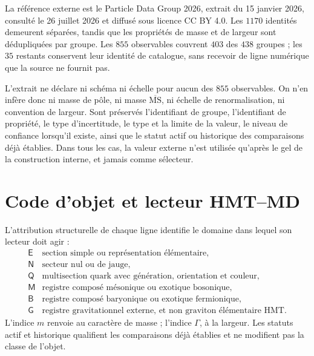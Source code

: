 La référence externe est le Particle Data Group 2026, extrait du 15 janvier 2026, consulté le 26 juillet 2026 et diffusé sous licence CC BY 4.0. Les \(1170\) identités demeurent séparées, tandis que les propriétés de masse et de largeur sont dédupliquées par groupe. Les \(855\) observables couvrent \(403\) des \(438\) groupes ; les \(35\) restants conservent leur identité de catalogue, sans recevoir de ligne numérique que la source ne fournit pas.

L’extrait ne déclare ni schéma ni échelle pour aucun des \(855\) observables. On n’en infère donc ni masse de pôle, ni masse \(\overline{\mathrm{MS}}\), ni échelle de renormalisation, ni convention de largeur. Sont préservés l’identifiant de groupe, l’identifiant de propriété, le type d’incertitude, le type et la limite de la valeur, le niveau de confiance lorsqu’il existe, ainsi que le statut actif ou historique des comparaisons déjà établies. Dans tous les cas, la valeur externe n’est utilisée qu’après le gel de la construction interne, et jamais comme sélecteur.

\section{Code d’objet et lecteur HMT--MD}

L’attribution structurelle de chaque ligne identifie le domaine dans lequel son lecteur doit agir :
\[
\begin{array}{c|l}
\mathsf E&\text{section simple ou représentation élémentaire},\\
\mathsf N&\text{secteur nul ou de jauge},\\
\mathsf Q&\text{multisection quark avec génération, orientation et couleur},\\
\mathsf M&\text{registre composé mésonique ou exotique bosonique},\\
\mathsf B&\text{registre composé baryonique ou exotique fermionique},\\
\mathsf G&\text{registre gravitationnel externe, et non graviton élémentaire HMT}.
\end{array}
\tag{I2}\label{eq:cobertura-inventario-total-rev6}
\]
L’indice \(m\) renvoie au caractère de masse ; l’indice \(\Gamma\), à la largeur. Les statuts actif et historique qualifient les comparaisons déjà établies et ne modifient pas la classe de l’objet.

